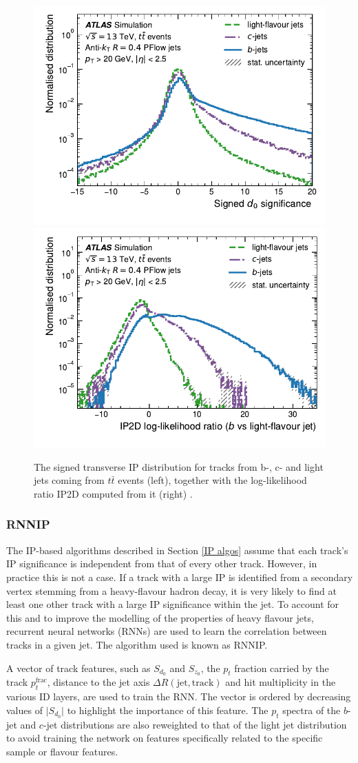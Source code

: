 \documentclass[10pt,a4paper]{book}
\begin{document}
\begin{figure}
    \centering
    \includegraphics[width=0.48\linewidth]{atlas/ftag/d0sig.pdf}
    \includegraphics[width=0.48\linewidth]{atlas/ftag/ip2d.pdf}

    \caption{The signed transverse IP distribution for tracks from b-, c- and light jets coming from $t\bar{t}$ events (left), together with the log-likelihood ratio IP2D computed from it (right) \cite{ATLAS:2022qxm}.}
    \label{fig:ip2d}
\end{figure}

\subsubsection{RNNIP}

The IP-based algorithms described in Section \ref{IP algos} assume that each track's IP significance is independent from that of every other track. However, in practice this is not a case. If a track with a large IP is identified from a secondary vertex stemming from a heavy-flavour hadron decay, it is very likely to find at least one other track with a large IP significance within the jet. To account for this and to improve the modelling of the properties of heavy flavour jets, recurrent neural networks (RNNs) are used to learn the correlation between tracks in a given jet. The algorithm used is known as RNNIP.

A vector of track features, such as $S_{d_0}$ and $S_{z_0}$, the $p_t$ fraction carried by the track $p_t^{\text{frac}}$, distance to the jet axis $\Delta R(\text{jet}, \text{track})$ and hit multiplicity in the various ID layers, are used to train the RNN. The vector is ordered by decreasing values of $\vert S_{d_0}\vert$ to highlight the importance of this feature. The $p_t$ spectra of the $b$-jet and $c$-jet distributions are also reweighted to that of the light jet distribution to avoid training the network on features specifically related to the specific sample or flavour features.
\end{document}

